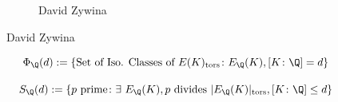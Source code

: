 \begin{frame}[plain]
\begin{figure}[h]
\begin{subfigure}{0.3\textwidth}
	\caption{\hspace{0.1cm}David Zywina}
	\end{subfigure}
	\end{figure}
\end{frame}


\begin{frame}[plain]
\end{frame}


\begin{frame}[plain]
	\[
	\Phi_\Q(d):=\{\text{Set of Iso. Classes of } E(K)_{\text{tors}} \colon E_\Q(K), [K \colon \Q]=d\}
	\] \pause
	
	\[
	S_\Q(d):=\{ p \text{ prime} \colon \exists\ E_\Q(K), p \text{ divides } |E_\Q(K)|_{\text{tors}}, [K \colon \Q] \leq d \}
	\] 
\end{frame}


\begin{frame}[plain]
\end{frame}

